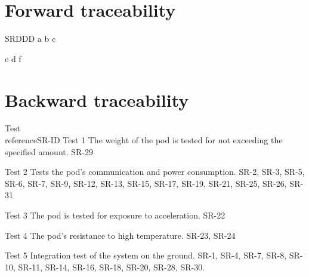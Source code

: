 \documentclass[Main]{subfiles}
\begin{document}
\chapter{Forward traceability}

\begin{TraceForward}{SR}{DDD}
\TF
{a}
{b}
{c}

\TF
{e}
{d}
{f}

\end{TraceForward}

\chapter{Backward traceability}

\begin{TraceBackward}{Test\\reference}{SR-ID}
\TB
{Test 1}
{The weight of the pod is tested for not exceeding the specified amount.}
{SR-29}

\TB
{Test 2}
{Tests the pod's communication and power consumption.}
{SR-2, SR-3, SR-5, SR-6, SR-7, SR-9, SR-12, SR-13, SR-15, SR-17, SR-19, SR-21, SR-25, SR-26, SR-31}

\TB
{Test 3}
{The pod is tested for exposure to acceleration.}
{SR-22}

\TB
{Test 4}
{The pod's resistance to high temperature.}
{SR-23, SR-24}

\TB
{Test 5}
{Integration test of the system on the ground.}
{SR-1, SR-4, SR-7, SR-8, SR-10, SR-11, SR-14, SR-16, SR-18, SR-20, SR-28, SR-30.}

\end{TraceBackward}
\end{document}
